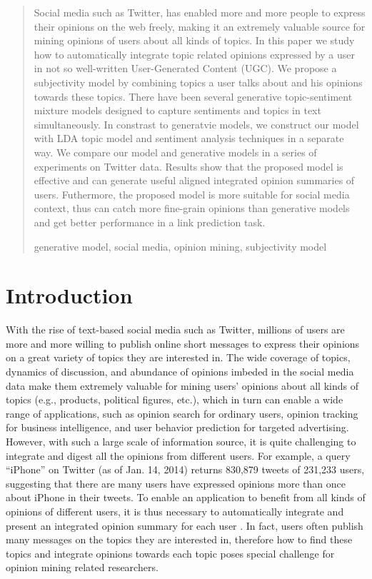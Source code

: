\documentclass[runningheads,a4paper]{llncs}
\newcommand{\keywords}[1]{\par\addvspace\baselineskip
\noindent\keywordname\enspace\ignorespaces#1}
\begin{document}
\begin{abstract}
Social media such as Twitter, has enabled more and more people to express their opinions on the web freely, making it an extremely valuable source for mining opinions of users about all kinds of topics. In this paper we study how to automatically integrate topic related opinions expressed by a user in not so well-written User-Generated Content (UGC). We propose a subjectivity model by combining topics a user talks about and his opinions towards these topics. There have been several generative topic-sentiment mixture models designed to capture sentiments and topics in text simultaneously. In constrast to generatvie models, we construct our model with LDA topic model and sentiment analysis techniques in a separate way. We compare our model and generative models in a series of experiments on Twitter data. Results show that the proposed model is effective and can generate useful aligned integrated opinion summaries of users. Futhermore, the proposed model is more suitable for social media context, thus can catch more fine-grain opinions than generative models and get better performance in a link prediction task. 
\keywords{generative model, social media, opinion mining, subjectivity model}
\end{abstract}

\section{Introduction}
\label{sec1}

With the rise of text-based social media such as Twitter, millions of users are more and more willing to publish online short messages to express their opinions on a great variety of topics they are interested in. The wide coverage of topics, dynamics of discussion, and abundance of opinions imbeded in the social media data make them extremely valuable for mining users' opinions about all kinds of topics (e.g., products, political figures, etc.), which in turn can enable a wide range of applications, such as opinion search for ordinary users, opinion tracking for business intelligence, and user behavior prediction for targeted advertising. 
However, with such a large scale of information source, it is quite challenging to integrate and digest all the opinions from different users. For example, a query ``iPhone'' on Twitter (as of Jan. 14, 2014) returns 830,879 tweets of 231,233 users, suggesting that there are many users have expressed opinions more than once about iPhone in their tweets. To enable an application to benefit from all kinds of opinions of different users, it is thus necessary to automatically integrate and present an integrated opinion summary for each user \cite{lu2008opinion}. In fact, users often publish many messages on the topics they are interested in, therefore how to find these topics and integrate opinions towards each topic poses special challenge for opinion mining related researchers.
\end{document}
